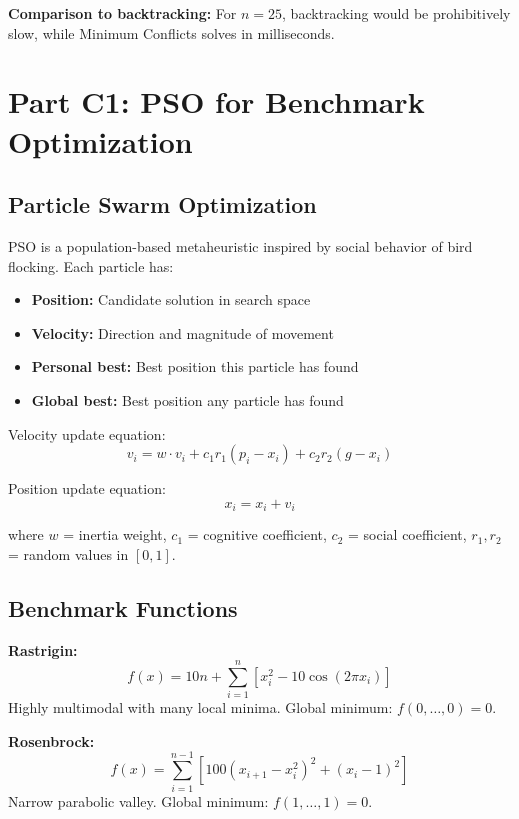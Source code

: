 \documentclass[letterpaper]{article}
\begin{document}
\textbf{Comparison to backtracking:} For $n=25$, backtracking would be prohibitively slow, while Minimum Conflicts solves in milliseconds.

\section{Part C1: PSO for Benchmark Optimization}

\subsection{Particle Swarm Optimization}

PSO is a population-based metaheuristic inspired by social behavior of bird flocking. Each particle has:
\begin{itemize}
\item \textbf{Position:} Candidate solution in search space
\item \textbf{Velocity:} Direction and magnitude of movement
\item \textbf{Personal best:} Best position this particle has found
\item \textbf{Global best:} Best position any particle has found
\end{itemize}

Velocity update equation:
\begin{equation}
v_i = w \cdot v_i + c_1 r_1 (p_i - x_i) + c_2 r_2 (g - x_i)
\end{equation}

Position update equation:
\begin{equation}
x_i = x_i + v_i
\end{equation}

where $w$ = inertia weight, $c_1$ = cognitive coefficient, $c_2$ = social coefficient, $r_1, r_2$ = random values in $[0,1]$.

\subsection{Benchmark Functions}

\textbf{Rastrigin:}
\begin{equation}
f(x) = 10n + \sum_{i=1}^n [x_i^2 - 10\cos(2\pi x_i)]
\end{equation}
Highly multimodal with many local minima. Global minimum: $f(0,\ldots,0) = 0$.

\textbf{Rosenbrock:}
\begin{equation}
f(x) = \sum_{i=1}^{n-1} [100(x_{i+1} - x_i^2)^2 + (x_i - 1)^2]
\end{equation}
Narrow parabolic valley. Global minimum: $f(1,\ldots,1) = 0$.
\end{document}
